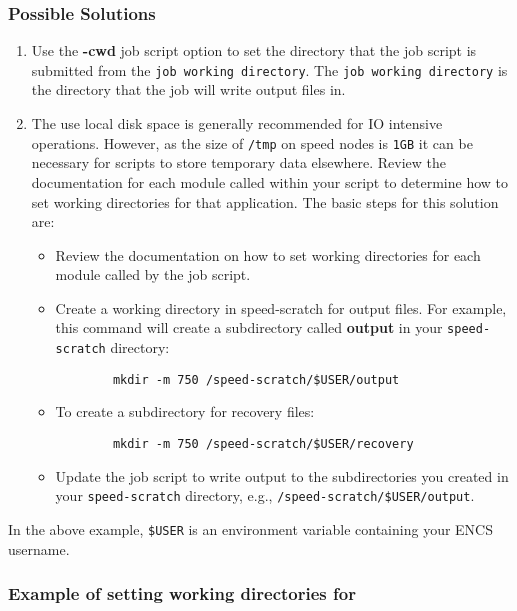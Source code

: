 \documentclass{easychair}
\begin{document}
\subsubsection{Possible Solutions}

\begin{enumerate}
	\item
Use the \textbf{-cwd} job script option to set the directory that the job script
 is submitted from the \texttt{job working directory}. The \texttt{job working directory} is the directory that the job will write output files in.
	\item
The use local disk space is generally recommended for IO intensive operations. However, as the size of \texttt{/tmp} on speed nodes 
is \texttt{1GB} it can be necessary for scripts to store temporary data 
elsewhere. 
Review the documentation for each module called within your script to 
determine how to set working directories for that application. 
The basic steps for this solution are:
\begin{itemize}
	\item
	Review the documentation on how to set working directories for 
	each module called by the job script.
	\item
	Create a working directory in speed-scratch for output files. 
	For example, this command will create a subdirectory called \textbf{output}
	 in your \verb!speed-scratch! directory:
	 \begin{verbatim}
		mkdir -m 750 /speed-scratch/$USER/output
	 \end{verbatim}
	\item
	To create a subdirectory for recovery files:
	\begin{verbatim}
		mkdir -m 750 /speed-scratch/$USER/recovery
	\end{verbatim}
	\item
	Update the job script to write output to the subdirectories you created in your \verb!speed-scratch! directory, e.g., \verb!/speed-scratch/$USER/output!.
	\end{itemize}
\end{enumerate}
In the above example, \verb!$USER! is an environment variable containing your ENCS username.

\subsubsection{Example of setting working directories for }
\end{document}
